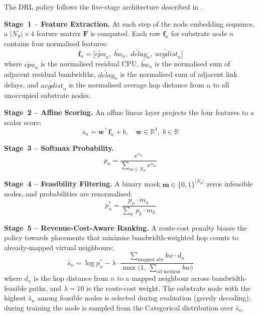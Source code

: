 \documentclass[12pt,a4paper]{report}
\begin{document}
The DRL policy follows the five-stage architecture described in \cite{zhang2022drl}.

\textbf{Stage~1 -- Feature Extraction.} At each step of the node embedding sequence, a
$|N_S|\times 4$ feature matrix $\mathbf{F}$ is computed. Each row $\mathbf{f}_n$ for substrate
node $n$ contains four normalised features:
\begin{equation}
  \mathbf{f}_n = \bigl[\tilde{cpu}_n,\;
                        \tilde{bw}_n,\;
                        \tilde{delay}_n,\;
                        \widetilde{avgdist}_n\bigr]
\end{equation}
where $\tilde{cpu}_n$ is the normalised residual CPU, $\tilde{bw}_n$ is the normalised sum of
adjacent residual bandwidths, $\tilde{delay}_n$ is the normalised sum of adjacent link delays,
and $\widetilde{avgdist}_n$ is the normalised average hop distance from $n$ to all unoccupied
substrate nodes.

\textbf{Stage~2 -- Affine Scoring.} An affine linear layer projects the four features to a
scalar score:
\begin{equation}
  s_n = \mathbf{w}^\top\mathbf{f}_n + b,\quad
  \mathbf{w}\in\mathbb{R}^4,\;b\in\mathbb{R}
\end{equation}

\textbf{Stage~3 -- Softmax Probability.}
\begin{equation}
  p_n = \frac{e^{s_n}}{\displaystyle\sum_{m\in N_S} e^{s_m}}
\end{equation}

\textbf{Stage~4 -- Feasibility Filtering.} A binary mask $\mathbf{m}\in\{0,1\}^{|N_S|}$ zeros
infeasible nodes, and probabilities are renormalised:
\begin{equation}
  p_n^{*} = \frac{p_n\cdot m_n}{\displaystyle\sum_{k}\,p_k\cdot m_k}
\end{equation}

\textbf{Stage~5 -- Revenue-Cost-Aware Ranking.} A route-cost penalty biases the policy towards
placements that minimise bandwidth-weighted hop counts to already-mapped virtual neighbours:
\begin{equation}
  \hat{s}_n = \log p_n^{*}
             - \lambda\cdot
               \frac{\displaystyle\sum_{\text{mapped nbr}}\!bw\cdot d_n}
                    {\max\!\bigl(1,\,\sum_{\text{all incident}}\!bw\bigr)}
  \label{eq:ranking}
\end{equation}
where $d_n$ is the hop distance from $n$ to a mapped neighbour across bandwidth-feasible paths,
and $\lambda=10$ is the route-cost weight. The substrate node with the highest $\hat{s}_n$
among feasible nodes is selected during evaluation (greedy decoding); during training the node
is sampled from the Categorical distribution over $\hat{s}_n$.
\end{document}
